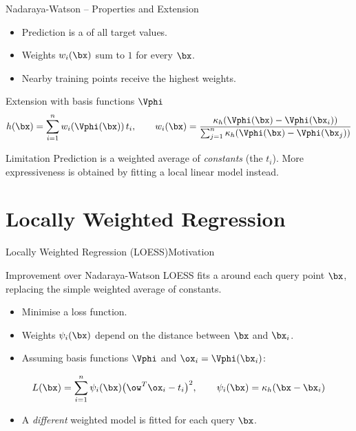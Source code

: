 \begin{frame}{Nadaraya-Watson -- Properties and Extension}{}
  \begin{itemize}
    \item Prediction is a  of all target values.
    \item Weights $w_i(\bx)$ sum to $1$ for every $\bx$.
    \item Nearby training points receive the highest weights.
  \end{itemize}

  \medskip
  \begin{block}{Extension with basis functions $\Vphi$}
    \[
      h(\bx)=\sum_{i=1}^n w_i(\Vphi(\bx))\,t_i,\qquad
      w_i(\bx)=\frac{\kappa_h(\Vphi(\bx)-\Vphi(\bx_i))}%
                    {\sum_{j=1}^n\kappa_h(\Vphi(\bx)-\Vphi(\bx_j))}
    \]
  \end{block}

  \medskip
  \begin{alertblock}{Limitation}
    Prediction is a weighted average of \emph{constants} (the $t_i$).
    More expressiveness is obtained by fitting a local linear model instead.
  \end{alertblock}
\end{frame}

\section{Locally Weighted Regression}

\begin{frame}{Locally Weighted Regression (LOESS)}{Motivation}
  \begin{block}{Improvement over Nadaraya-Watson}
    LOESS fits a  around each query point $\bx$,
    replacing the simple weighted average of constants.
  \end{block}

  \medskip
  \begin{itemize}
    \item Minimise a  loss function.
    \item Weights $\psi_i(\bx)$ depend on the distance between $\bx$ and $\bx_i$.
    \item Assuming basis functions $\Vphi$ and $\ox_i=\Vphi(\bx_i)$:
  \end{itemize}

  \[
    L(\bx)=\sum_{i=1}^n\psi_i(\bx)\bigl(\ow^T\ox_i-t_i\bigr)^2,
    \qquad
    \psi_i(\bx)=\kappa_h(\bx-\bx_i)
  \]

  \begin{itemize}
    \item A \emph{different} weighted model is fitted for each query $\bx$.
  \end{itemize}
\end{frame}

